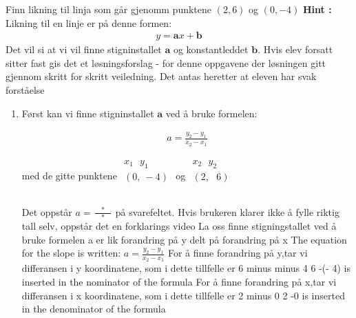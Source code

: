 \documentclass[12pt,twoside,onecolumn]{article}
\begin{document}
\begin{Exercise}
Finn likning til linja som går gjenomm punktene $(2,6)$  og  $(0,-4 )$
\newline\newline
\textbf{Hint :}\newline 
Likning til en linje er på denne formen:
\begin{align}
y=\mathbf{a}x+ \mathbf{b}
\end{align}
Det vil si at vi vil finne stigninstallet $\mathbf{a}$ og konstantleddet $\mathbf{b}$.
\newline\newline
{\color{Maroon}Hvis elev forsatt sitter fast gis det et løsningsforslag -  for denne oppgavene der løsningen gitt gjennom skritt for skritt veiledning. Det antas heretter at eleven har svak forståelse}

\begin{enumerate}
\item Først kan vi finne stigninstallet $\mathbf{a}$  ved å bruke formelen:

\begin{align}
a =  \frac{y_2 - y_1}{x_2 - x_1}
\end{align}

med de gitte punktene
$
\begin{matrix}
  x_1\:\:\: y_1 \\ 
 (0,\:-4) \\
\phantom{0}
\end{matrix}
$ og $
\begin{matrix}
  x_2\:\:\: y_2 \\ 
 (2,\:\:\:6)  \\
\phantom{0}
\end{matrix}
$ 

{\color{Maroon} Det oppstår $a=\frac{\:\:\:\:*\:\:\:\:}{\:\:\:\:*\:\:\:\:}$ på svarefeltet.
Hvis brukeren klarer ikke å fylle riktig tall selv, oppstår det en forklarings video}
\newline
\newline
{\color{gray} La oss finne stigningstallet ved å bruke formelen a er lik forandring på y delt på forandring på x }
{\color{PineGreen} The equation for the slope is written: $a =  \frac{y_2 - y_1}{x_2 - x_1}$  }
\newline
{\color{gray}  For å finne forandring på y,tar vi differansen i y koordinatene, som i dette tillfelle er 6 minus minus 4 }
{\color{PineGreen}  6 -(- 4) is inserted in the nominator of the formula  }
\newline
{\color{gray}  For å finne forandring på x,tar vi differansen i x koordinatene, som i dette tillfelle er 2 minus 0 }
{\color{PineGreen} 2 -0 is inserted in the denominator of the formula  }


\end{enumerate}
\end{Exercise}
\end{document}
